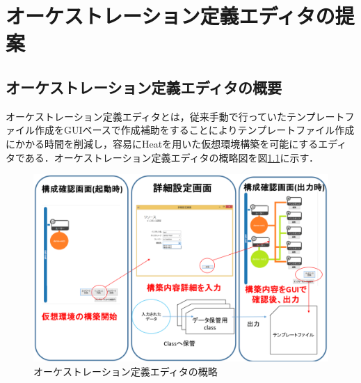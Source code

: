 \documentclass[mingoth]{kut-paper}		%
\begin{document}
	
	
\chapter{オーケストレーション定義エディタの提案}
%
	\section{オーケストレーション定義エディタの概要}
		オーケストレーション定義エディタとは，従来手動で行っていたテンプレートファイル作成をGUIベースで作成補助をすることによりテンプレートファイル作成にかかる時間を削減し，容易にHeatを用いた仮想環境構築を可能にするエディタである．オーケストレーション定義エディタの概略図を図\ref{graf:2}に示す．
		\vspace{-2mm}
		\begin{figure}[H]
			\begin{center}
				\includegraphics[scale=0.4]{Document/GUIEditorOverview.eps}
				\caption{オーケストレーション定義エディタの概略}
				\label{graf:2}
			\end{center}
		\end{figure}
\end{document}
